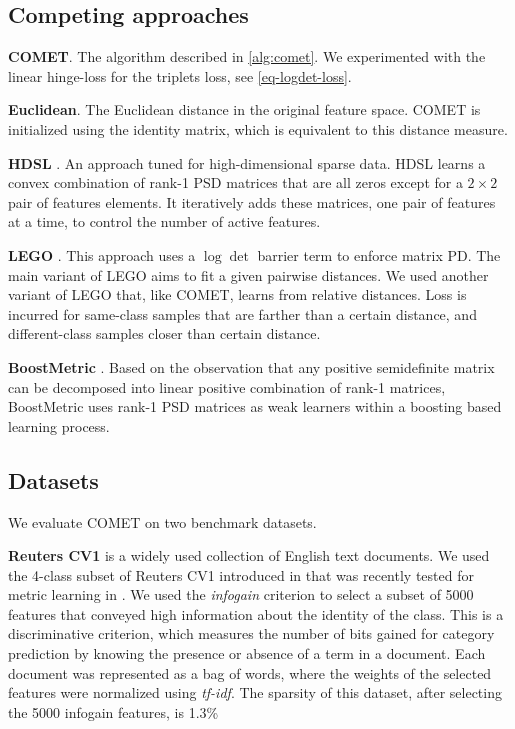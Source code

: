 \documentclass{article}
\begin{document}
\subsection{Competing approaches}

\textbf{COMET}. The algorithm described in \ref{alg:comet}. We experimented with the linear hinge-loss for the triplets loss, see \eqref{eq-logdet-loss}.

\textbf{Euclidean}. The Euclidean distance in the original feature space. COMET is initialized using the identity matrix, which is equivalent to this distance measure.

\textbf{HDSL} \cite{hdsl}. An approach tuned for high-dimensional sparse data. HDSL learns a convex combination of rank-1 PSD matrices that are all zeros except for a $2\times2$ pair of features elements. It iteratively adds these matrices, one pair of features at a time, to control the number of active features.

\textbf{LEGO} \cite{lego}. This approach uses a $\log \det$ barrier term to enforce matrix PD. The main variant of LEGO aims to fit a given pairwise distances. We used another variant of LEGO that, like COMET, learns from relative distances. Loss is incurred for same-class samples that are farther than a certain distance, and different-class samples closer than certain distance.

\textbf{BoostMetric} \cite{boost}. Based on the observation that any positive semidefinite matrix can be decomposed into linear positive combination of rank-1 matrices, BoostMetric uses rank-1 PSD matrices as weak learners within a boosting based learning process.

\subsection{Datasets}
We evaluate COMET on two benchmark datasets.

\textbf{Reuters CV1} is a widely used collection of English text documents. We used the 4-class subset of Reuters CV1 introduced in \cite{CaiRCV14} that was recently tested for metric learning in \cite{hdsl}. We used the \textit{infogain} criterion \cite{infogain} to select a subset of 5000 features that conveyed high information about the identity of the class. This is a discriminative criterion, which measures the number of bits gained for category prediction by knowing the presence or absence of a term in a document. Each document was represented as a bag of words, where the weights of the selected features were normalized using \textit{tf-idf}. The sparsity of this dataset, after selecting the 5000 infogain features, is 1.3\%
\end{document}
